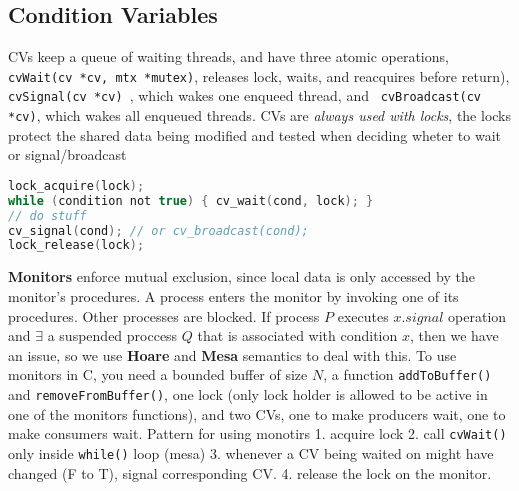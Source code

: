 \subsection*{Condition Variables}
CVs keep a queue of waiting threads, and have three atomic operations,
{\tt cvWait(cv *cv, mtx *mutex)}, releases lock, waits, and reacquires before
return), {\tt cvSignal(cv *cv) }, which wakes one enqueed thread, and {\tt
cvBroadcast(cv *cv)}, which wakes all enqueued threads. CVs are \textit{always used with locks}, the locks protect the shared data being modified and tested when deciding wheter to wait or signal/broadcast
\begin{lstlisting}[basicstyle=\tiny, language=c]
lock_acquire(lock);
while (condition not true) { cv_wait(cond, lock); }
// do stuff
cv_signal(cond); // or cv_broadcast(cond);
lock_release(lock);
\end{lstlisting}
\textbf{Monitors} enforce mutual exclusion, since local data is only accessed by the monitor's procedures. A process enters the monitor by invoking one of its procedures. Other processes are blocked.
If process $P$ executes $x.signal$ operation and $\exists$ a suspended proccess
$Q$ that is associated with condition $x$, then we have an issue, so we use
\textbf{Hoare} and \textbf{Mesa} semantics to deal with this. To use monitors in 
C, you need a bounded buffer of size $N$, a function {\tt addToBuffer()} and
{\tt removeFromBuffer()}, one lock (only lock holder is allowed to be active in
one of the monitors functions), and two CVs, one to make producers wait, one to
make consumers wait.
Pattern for using monotirs
    1. acquire lock
    2. call {\tt cvWait()} only inside {\tt while()} loop (mesa)
    3. whenever a CV being waited on might have changed (F to T), signal
    corresponding CV.
    4. release the lock on the monitor.

